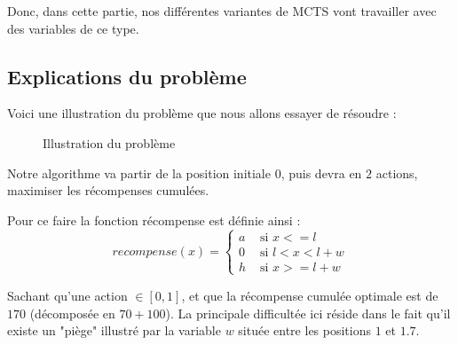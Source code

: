\documentclass[pdftex,french, english]{article}	%
\begin{document}
	Donc, dans cette partie, nos différentes variantes de MCTS vont travailler avec des variables de ce type.

	\subsection{Explications du problème} \label{probleme}

	Voici une illustration du problème \cite{couetoux01} que nous allons essayer de résoudre : \\

	\begin{figure}[h]
	\centering
		\caption{Illustration du problème} \label{fig:probleme}
	\end{figure}

	Notre algorithme va partir de la position initiale $0$, puis devra en $2$ actions, maximiser les récompenses cumulées.

	Pour ce faire la fonction récompense est définie ainsi :
	$$recompense(x) = \left\{
	\begin{array}{ll}
 	a & \mbox{ si $x <= l$}\\
 	0 & \mbox{ si $l < x < l + w$}\\
 	h & \mbox{ si $x >= l + w$}
 	\end{array}\right.$$

	Sachant qu'une action $\in [0, 1]$, et que la récompense cumulée optimale est de $170$ (décomposée en $70 + 100$).
	La principale difficultée ici réside dans le fait qu'il existe un "piège" illustré par la variable $w$ située entre les positions $1$ et $1.7$.
\end{document}
